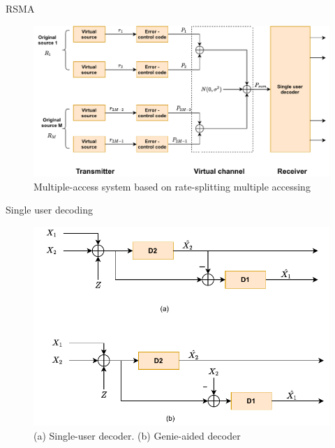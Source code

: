 \documentclass[10pt]{beamer}
\begin{document}
	\begin{frame}[t]{RSMA}
		\begin{figure}[htb!]
		\centering
		\includegraphics[height=.6\textheight]{pic_2.pdf}
		\caption{ Multiple-access system based on rate-splitting multiple accessing}
		\label{fig4}
	\end{figure}		
	\end{frame}
	\begin{frame}[t]{Single user decoding}
	\begin{figure}[htb!]
		\centering
		\includegraphics[height=.6\textheight]{pic_3.pdf}
		\caption{(a) Single-user decoder. (b) Genie-aided decoder}
		\label{fig5}
	\end{figure}		
\end{frame}
\end{document}
